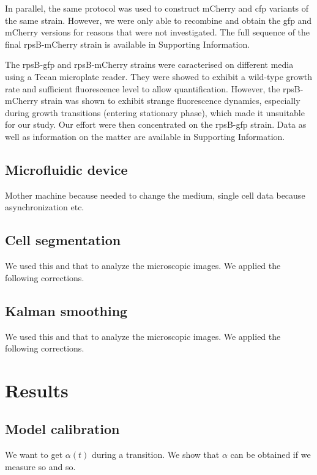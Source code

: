 In parallel, the same protocol was used to construct mCherry and cfp variants of the same strain.
However, we were only able to recombine and obtain the gfp and mCherry versions for reasons that were not investigated.
The full sequence of the final rpsB-mCherry strain is available in Supporting Information.

The rpsB-gfp and rpsB-mCherry strains were caracterised on different media using a Tecan microplate reader.
They were showed to exhibit a wild-type growth rate and sufficient fluorescence level to allow quantification.
However, the rpsB-mCherry strain was shown to exhibit strange fluorescence dynamics, especially during growth transitions (entering stationary phase), which made it unsuitable for our study.
Our effort were then concentrated on the rpsB-gfp strain.
Data as well as information on the matter are available in Supporting Information.

\subsection{Microfluidic device}

Mother machine because needed to change the medium, single cell data because asynchronization etc.

\subsection{Cell segmentation}

We used this and that to analyze the microscopic images.
We applied the following corrections.

\subsection{Kalman smoothing}

We used this and that to analyze the microscopic images.
We applied the following corrections.

\section{Results}

\subsection{Model calibration}

We want to get $\alpha (t)$ during a transition. We show that $\alpha$ can be obtained if we measure so and so.

